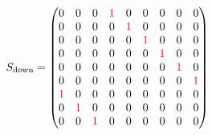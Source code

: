 \begin{align}
  S_{\text{down}} =
  \begin{pmatrix}
    0                  & 0                  & 0                  & \textcolor{red}{1} & 0                  & 0                  & 0                  & 0                  & 0                  \\
    0                  & 0                  & 0                  & 0                  & \textcolor{red}{1} & 0                  & 0                  & 0                  & 0                  \\
    0                  & 0                  & 0                  & 0                  & 0                  & \textcolor{red}{1} & 0                  & 0                  & 0                  \\
    0                  & 0                  & 0                  & 0                  & 0                  & 0                  & \textcolor{red}{1} & 0                  & 0                  \\
    0                  & 0                  & 0                  & 0                  & 0                  & 0                  & 0                  & \textcolor{red}{1} & 0                  \\
    0                  & 0                  & 0                  & 0                  & 0                  & 0                  & 0                  & 0                  & \textcolor{red}{1} \\
    \textcolor{red}{1} & 0                  & 0                  & 0                  & 0                  & 0                  & 0                  & 0                  & 0                  \\
    0                  & \textcolor{red}{1} & 0                  & 0                  & 0                  & 0                  & 0                  & 0                  & 0                  \\
    0                  & 0                  & \textcolor{red}{1} & 0                  & 0                  & 0                  & 0                  & 0                  & 0
  \end{pmatrix}
\end{align}


